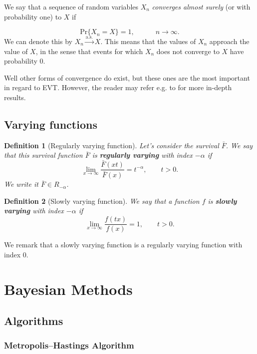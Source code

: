 \documentclass[11pt,a4paper,openany ]{book}
\newtheorem{definition}{Definition}[chapter]
\begin{document}
We say that a sequence of random variables $X_n$ \emph{converges almost surely} (or with probability one) to $X$ if 

\begin{equation}
\text{Pr}\Big\{X_n=X\Big\}=1, \quad\qquad n\to\infty.
\end{equation}
We can denote this by $X_n\stackrel{\text{a.s.}}{\rightarrow} X$. This means that the values of $X_n$ approach the value of $X$, in the sense that events for which $X_n$ does not converge to $X$ have probability 0.


Well other forms of convergence do exist, but these ones are the most important in regard to EVT. However, the reader may refer e.g. to \citet{lafaye_understanding_2009}  for more in-depth results.

\section{Varying functions}\label{app:varying}

\begin{definition}[Regularly varying function]
Let's consider the survival $\bar{F}$. We say that this survival function $\bar{F}$ is \textbf{regularly varying} with index $-\alpha$ if
\begin{equation}
\displaystyle{\lim_{x \to \infty}} \frac{\bar{F}(xt)}{\bar{F}(x)}=t^{-\alpha}, \qquad t>0. 
\end{equation}
We write it $\bar{F}\in R_{-\alpha}$.
\end{definition}

\begin{definition}[Slowly varying function]
We say that a function $f$ is \textbf{slowly varying} with index $-\alpha$ if
\begin{equation}
\displaystyle{\lim_{x \to \infty}} \frac{f(t x)}{f(x)}=1, \qquad t>0. 
\end{equation}
\end{definition}
We remark that a slowly varying function is a regularly varying function with index 0.
\chapter{Bayesian Methods}\label{appB}

\section{Algorithms}

\subsection{Metropolis–Hastings Algorithm}
\end{document}
